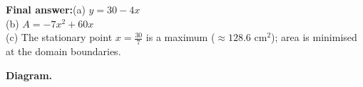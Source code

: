 \documentclass[11pt]{article}
\begin{document}
\begin{answerbox}
\textbf{Final answer:}\quad (a) \(\displaystyle  y = 30 - 4x \) \\[3pt]  (b) \(\displaystyle  A = -7x^2 + 60x \) \\[3pt]  (c) The stationary point \(\displaystyle  x = \tfrac{30}{7} \) is a maximum (\(\displaystyle  \approx 128.6 \text{ cm}^2 \)); area is minimised at the domain boundaries.
\end{answerbox}
\textbf{Diagram.}

\begin{center}
\end{center}
\end{document}
